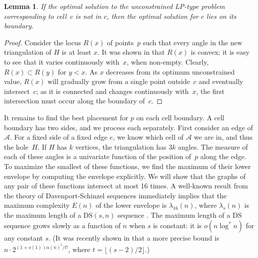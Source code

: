 \documentclass{cccg13}
\newtheorem{lemma}{Lemma}
\newcommand\arr{\mathcal A}
\begin{document}
\begin{lemma}\label{one}  If the optimal solution to the unconstrained LP-type problem corresponding to cell~$c$ is not in $c$, then the optimal solution for $c$ lies on its boundary.\end{lemma}
\begin{proof} Consider the locus $R(x)$ of points~$p$ such that every angle in the new triangulation of $H$ is at least $x$.  It was shown in \cite{lp} that $R(x)$ is convex; it is easy to see that it varies continuously with~$x$, when non-empty.  Clearly, $R(x) \subset R(y)$ for $y<x$.  As $x$ decreases from its optimum unconstrained value, $R(x)$ will gradually grow from a single point outside~$c$ and eventually intersect~$c$; as it is connected and changes continuously with~$x$, the first intersection must occur along the boundary of~$c$.\end{proof}

It remains to find the best placement for $p$ on each cell boundary.  A cell boundary has two sides, and we process each separately.  First consider an edge of $\arr$.  For a fixed side of a fixed edge $e$, we know which cell of $\arr$ we are in, and thus the hole~$H$.  If $H$ has $k$ vertices, the triangulation has $3k$ angles.  The measure of each of these angles is a univariate function of the position of~$p$ along the edge.  To maximize the smallest of these functions, we find the maximum of their lower envelope by computing the envelope explicitly.  We will show that the graphs of any pair of these functions intersect at most 16 times.  A well-known result from the theory of Davenport-Schinzel sequences immediately implies that the maximum complexity $E(n)$ of the lower envelope is $\lambda_{16}(n)$, where $\lambda_s(n)$ is the maximum length of a DS$(s,n)$ sequence \cite[section 1.2]{ds}.  The maximum length of a DS sequence grows slowly as a function of $n$ when $s$ is constant: it is $o(n\log^*n)$ for any constant $s$.  (It was recently shown in \cite{tight} that a more precise bound is $n\cdot2^{(1+o(1))\alpha(n)^t/t!}$, where $t=\lfloor(s-2)/2\rfloor$.)
\end{document}
